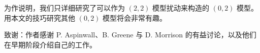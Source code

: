 为作说明，我们只详细研究了可以作为 $(2,2)$ 模型扰动来构造的 $(0,2)$ 模型。用本文的技巧研究其他 $(0,2)$ 模型将会非常有趣。

致谢：作者感谢 P. Aspinwall、B. Greene 与 D. Morrison 的有益讨论，以及他们在早期阶段介绍自己的工作。

